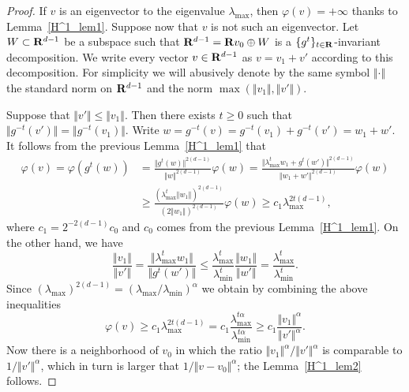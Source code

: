 \documentclass[11pt]{article}
\theoremstyle{definition}
\numberwithin{equation}{section}
\numberwithin{figure}{section}
\numberwithin{table}{section}
\DeclareMathOperator{\maxrm}{max}
\DeclareMathOperator{\minrm}{min}
\begin{document}
\begin{proof}
If $v$ is an eigenvector to the eigenvalue $\lambda _{\maxrm}$, then
$\varphi (v) = +\infty$ thanks to Lemma~\ref{H^1_lem1}. Suppose now that $v$ is not such an eigenvector. Let $W \subset {\bf R} ^{d-1}$ be a subspace such that ${\bf R} ^{d-1} = {\bf R} v_0 \oplus W$ is a $\{g^t\}_{t\in {\bf R}}$-invariant decomposition. We write every vector $v \in {\bf R}^{d-1}$ as $v = v_1 + v'$ according to this decomposition. For simplicity we will abusively denote by the same symbol $\Vert \cdot \Vert$ the standard norm on ${\bf R} ^{d-1}$ and the norm $\max (\Vert v_1 \Vert, \Vert v' \Vert)$.

Suppose that $\Vert v' \Vert \leqslant \Vert v_1 \Vert$. Then there exists $t \geqslant 0$ such that $\Vert g^{-t} (v') \Vert = \Vert g^{-t} (v_1) \Vert$. Write $w = g^{-t} (v) = g^{-t}(v_1) + g^{-t}(v') = w_1 + w'$. It follows from the previous Lemma~\ref{H^1_lem1} that
\begin{align*}
\varphi (v) = \varphi (g^t (w)) & = \frac{\Vert g^t(w) \Vert ^{2(d-1)}}{\Vert w \Vert ^{2(d-1)}} \varphi (w) = \frac{\Vert \lambda ^t _{\maxrm} w_1 + g^t(w') \Vert ^{2(d-1)}}{\Vert w_1 + w' \Vert ^{2(d-1)}} \varphi (w)\\
&\geqslant \frac{(\lambda _{\maxrm}^t \Vert w_1 \Vert)^{2(d-1)}}{(2 \Vert w_1 \Vert)^{2(d-1)}} \varphi (w)
\geqslant c_1 \lambda _{\maxrm}^{2t(d-1)},
\end{align*}
where $c_1 = 2 ^{-2(d-1)} c_0$ and $c_0$ comes from the previous Lemma~\ref{H^1_lem1}. On the other hand, we have
\[
\frac{\Vert v_1 \Vert}{\Vert v' \Vert} = \frac{\Vert \lambda _{\maxrm}^t w_1 \Vert}{\Vert g^t(w') \Vert}
\leqslant \frac{\lambda _{\maxrm}^t}{\lambda _{\minrm}^t} \frac{\Vert w_1 \Vert}{\Vert w' \Vert} =
\frac{\lambda _{\maxrm}^t}{\lambda _{\minrm}^t}.
\]
Since $(\lambda _{\maxrm})^{2(d-1)} = (\lambda _{\maxrm} / \lambda _{\minrm})^\alpha$ we obtain by combining the above inequalities
\[
\varphi (v) \geqslant c_1 \lambda _{\maxrm} ^{2t(d-1)} = c_1 \frac{\lambda _{\maxrm}^{t\alpha}}{ \lambda _{\minrm}^{t\alpha}}
\geqslant c_1 \frac{\Vert v_1 \Vert ^\alpha}{\Vert v' \Vert ^\alpha}.
\]
Now there is a neighborhood of $v_0$ in which the ratio $\Vert v_1 \Vert ^\alpha / \Vert v' \Vert ^\alpha$ is comparable to $1 / \Vert v' \Vert ^\alpha$, which in turn is larger that $1/ \Vert v - v_0 \Vert ^\alpha$; the Lemma~\ref{H^1_lem2} follows.
\end{proof}
\end{document}
